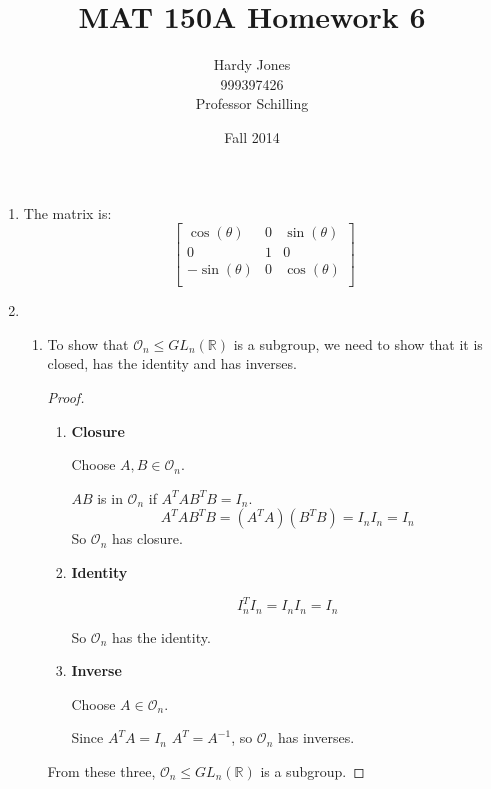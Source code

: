 \documentclass[12pt,letterpaper]{article}
\title{MAT 150A Homework 6\vspace{-2ex}}
\author{Hardy Jones\\
        999397426\\
        Professor Schilling\vspace{-2ex}}
\date{Fall 2014}
\begin{document}
  \maketitle

  \begin{enumerate}
    \item
      The matrix is:
      \[
        \begin{bmatrix}
          \cos(\theta)  & 0 & \sin(\theta) \\
          0             & 1 & 0            \\
          -\sin(\theta) & 0 & \cos(\theta) \\
        \end{bmatrix}
      \]

    \item
      \begin{enumerate}
        \item
          To show that $\mathcal{O}_n \le GL_n(\mathbb{R})$ is a subgroup, we need to show that it is closed, has the identity and has inverses.

          \begin{proof}
            \begin{enumerate}
              \item \textbf{Closure}

                Choose $A, B \in \mathcal{O}_n$.

                $AB$ is in $\mathcal{O}_n$ if $A^TAB^TB = I_n$.
                \[
                  A^TAB^TB = (A^TA)(B^TB) = I_nI_n = I_n
                \]
                So $\mathcal{O}_n$ has closure.

              \item \textbf{Identity}

                \[
                  I_n^TI_n = I_nI_n = I_n
                \]

                So $\mathcal{O}_n$ has the identity.

              \item \textbf{Inverse}

                Choose $A \in \mathcal{O}_n$.

                Since $A^TA = I_n$ $A^T = A^{-1}$,
                so $\mathcal{O}_n$ has inverses.
            \end{enumerate}

            From these three, $\mathcal{O}_n \le GL_n(\mathbb{R})$ is a subgroup.
          \end{proof}


\end{enumerate}
\end{enumerate}
\end{document}
